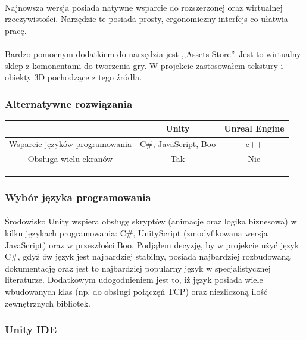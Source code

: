 \documentclass[12pt]{article}
\begin{document}
{{\paragraph{}
Najnowsza wersja posiada natywne wsparcie do rozszerzonej oraz wirtualnej rzeczywistości. Narzędzie te posiada prosty, ergonomiczny interfejs co ułatwia pracę.
\paragraph{}
Bardzo pomocnym dodatkiem do narzędzia jest ,,Assets Store''. Jest to wirtualny sklep z komonentami do tworzenia gry. W projekcie zastosowałem tekstury i obiekty 3D pochodzące z tego źródła.
\subsubsection{Alternatywne rozwiązania}
 \begin{tabular}{|c|c|c|}
 \hline
 \ & Unity & Unreal Engine \\ 
  \hline
 Wsparcie języków programowania & C\#, JavaScript, Boo & c++ \\  
  \hline
 Obsługa wielu ekranów & Tak & Nie \\
 \hline  
  &  &  \\
  \hline   
  &  &  \\
  \hline   
  &  &  \\
  \hline   
\end{tabular}

\subsubsection{Wybór języka programowania}
\paragraph{}
Środowisko Unity wspiera obsługę skryptów (animacje oraz logika biznesowa) w kilku językach programowania: C\#, UnityScript (zmodyfikowana wersja JavaScript)  oraz w przeszłości Boo. Podjąłem decyzję, by w projekcie użyć język C\#, gdyż ów język jest najbardziej stabilny, posiada najbardziej rozbudowaną dokumentację oraz jest to najbardziej popularny język w specjalistycznej literaturze. Dodatkowym udogodnieniem  jest to, iż  język posiada wiele wbudowanych klas (np. do obsługi połączęń TCP) oraz niezliczoną ilość zewnętrznych bibliotek.
\subsubsection{Unity IDE}
}}
\end{document}
